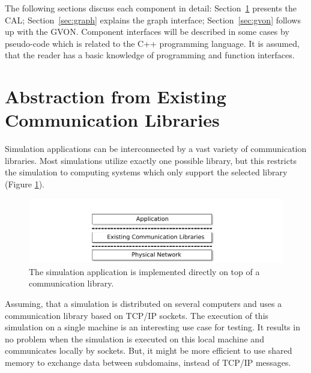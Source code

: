 \noindent The following sections discuss each component in detail:
Section~\ref{sec:comm_abstraction} presents the CAL;
Section~\ref{sec:graph} explains the graph interface;
Section~\ref{sec:gvon} follows up with the GVON.  Component interfaces
will be described in some cases by pseudo-code which is related to the
C++ programming language. It is assumed, that the reader has a basic
knowledge of programming and function interfaces.

\section{Abstraction from Existing Communication Libraries}
\label{sec:comm_abstraction}

Simulation applications can be interconnected by a vast variety of
communication libraries. Most simulations utilize exactly one possible
library, but this restricts the simulation to computing systems which
only support the selected library (Figure
\ref{fig:design_state_of_the_art}).

\begin{figure}[H]
  \centering \includegraphics[width=\textwidth]{graphics/30_design_state_of_the_art}
  \caption{The simulation application is implemented directly on top
    of a communication library.}
  \label{fig:design_state_of_the_art}
\end{figure}

Assuming, that a simulation is distributed on several computers and uses a
communication library based on TCP/IP sockets. The execution of this
simulation on a single machine is an interesting use case for
testing. It results in no problem when the simulation is executed on
this local machine and communicates locally by sockets.  But, it might
be more efficient to use shared memory to exchange data between
subdomains, instead of TCP/IP messages.

